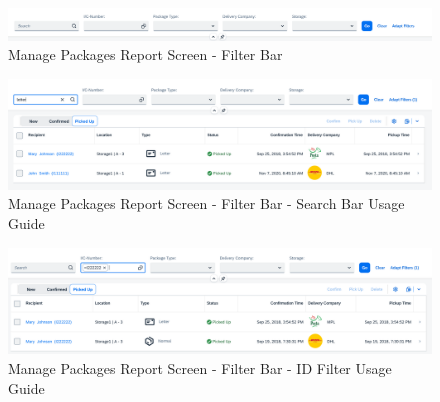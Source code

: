 \begin{figure}[H]
	\centering
	\includegraphics[width=1\linewidth]{images/user_doc/managePack/ReportScreen/browse/FilterBar.png}
	\caption{Manage Packages Report Screen - Filter Bar}
	\label{fig:MPFIlterBar}
\end{figure}

\begin{figure}[H]
	\centering
	\includegraphics[width=1\linewidth]{images/user_doc/managePack/ReportScreen/browse/defaultSearchBarUsage.png}
	\caption{Manage Packages Report Screen - Filter Bar - Search Bar Usage Guide}
	\label{fig:MPSearchBar}
\end{figure}

\begin{figure}[H]
	\centering
	\includegraphics[width=1\linewidth]{images/user_doc/managePack/ReportScreen/browse/defaultFreeTextIdUsage.png}
	\caption{Manage Packages Report Screen - Filter Bar - ID Filter Usage Guide}
	\label{fig:MPIDFIlter}
\end{figure}

